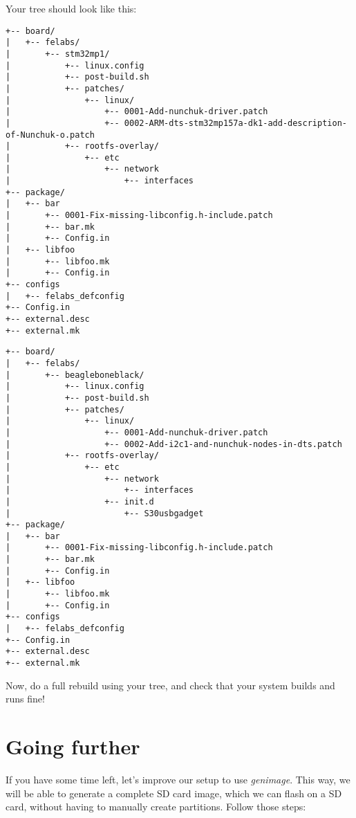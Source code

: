 Your  tree should look like this:

\if{}
\begin{verbatim}
+-- board/
|   +-- felabs/
|       +-- stm32mp1/
|           +-- linux.config
|           +-- post-build.sh
|           +-- patches/
|               +-- linux/
|                   +-- 0001-Add-nunchuk-driver.patch
|                   +-- 0002-ARM-dts-stm32mp157a-dk1-add-description-of-Nunchuk-o.patch
|           +-- rootfs-overlay/
|               +-- etc
|                   +-- network
|                       +-- interfaces
+-- package/
|   +-- bar
|       +-- 0001-Fix-missing-libconfig.h-include.patch
|       +-- bar.mk
|       +-- Config.in
|   +-- libfoo
|       +-- libfoo.mk
|       +-- Config.in
+-- configs
|   +-- felabs_defconfig
+-- Config.in
+-- external.desc
+-- external.mk
\end{verbatim}
\else
\begin{verbatim}
+-- board/
|   +-- felabs/
|       +-- beagleboneblack/
|           +-- linux.config
|           +-- post-build.sh
|           +-- patches/
|               +-- linux/
|                   +-- 0001-Add-nunchuk-driver.patch
|                   +-- 0002-Add-i2c1-and-nunchuk-nodes-in-dts.patch
|           +-- rootfs-overlay/
|               +-- etc
|                   +-- network
|                       +-- interfaces
|                   +-- init.d
|                       +-- S30usbgadget
+-- package/
|   +-- bar
|       +-- 0001-Fix-missing-libconfig.h-include.patch
|       +-- bar.mk
|       +-- Config.in
|   +-- libfoo
|       +-- libfoo.mk
|       +-- Config.in
+-- configs
|   +-- felabs_defconfig
+-- Config.in
+-- external.desc
+-- external.mk
\end{verbatim}
\fi

Now, do a full rebuild using your  tree, and check
that your system builds and runs fine!

\section{Going further}

If you have some time left, let's improve our setup to use {\em
  genimage}. This way, we will be able to generate a complete SD card
image, which we can flash on a SD card, without having to manually
create partitions. Follow those steps:

